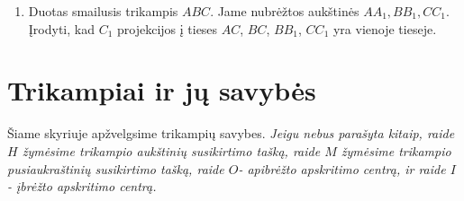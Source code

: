\begin{enumerate}
\item Duotas smailusis trikampis $ABC$. Jame nubrėžtos
  aukštinės $AA_1, BB_1, CC_1$. Įrodyti, kad $C_1$
  projekcijos į tieses $AC$, $BC$, $BB_1$, $CC_1$ yra
  vienoje tieseje.
\end{enumerate}

\newpage{}
\section{Trikampiai ir jų savybės}

Šiame skyriuje apžvelgsime trikampių savybes. \emph{Jeigu
nebus parašyta kitaip, raide $H$ žymėsime trikampio
aukštinių susikirtimo tašką, raide $M$ žymėsime trikampio
pusiaukraštinių susikirtimo tašką, raide $O$- apibrėžto
apskritimo centrą, ir raide $I$ - įbrėžto apskritimo
centrą.}  


